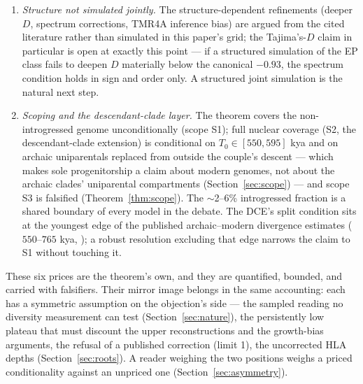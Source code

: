 \begin{enumerate}
\item \emph{Structure not simulated jointly.} The structure-dependent
refinements (deeper $D$, spectrum corrections, TMR4A inference bias) are
argued from the cited literature rather than simulated in this paper's
grid; the Tajima's-$D$ claim in particular is open at exactly this point
--- if a structured simulation of the EP class fails to deepen $D$
materially below the canonical $-0.93$, the spectrum condition holds in
sign and order only. A structured joint simulation is the natural next
step.
\item \emph{Scoping and the descendant-clade layer.} The theorem covers
the non-introgressed genome unconditionally (scope S1); full nuclear
coverage (S2, the descendant-clade extension) is conditional on
$T_0 \in [550, 595]$ kya and on archaic uniparentals replaced from
outside the couple's descent --- which makes sole progenitorship a claim
about modern genomes, not about the archaic clades' uniparental
compartments (Section~\ref{sec:scope}) --- and scope S3 is falsified
(Theorem~\ref{thm:scope}). The $\sim$2--6\%
introgressed fraction is a shared boundary of every model in the debate.
The DCE's split condition sits at the youngest edge of the published
archaic--modern divergence estimates ($550$--$765$ kya,
\citealp{Pruefer2014}); a robust resolution excluding that edge narrows
the claim to S1 without touching it.
\end{enumerate}

These six prices are the theorem's own, and they are quantified, bounded,
and carried with falsifiers. Their mirror image belongs in the same
accounting: each has a symmetric assumption on the objection's side ---
the sampled reading no diversity measurement can test
(Section~\ref{sec:nature}), the persistently low plateau that must
discount the upper reconstructions and the growth-bias arguments, the
refusal of a published correction (limit 1), the uncorrected HLA depths
(Section~\ref{sec:roots}). A reader weighing the two positions weighs a
priced conditionality against an unpriced one
(Section~\ref{sec:asymmetry}).

